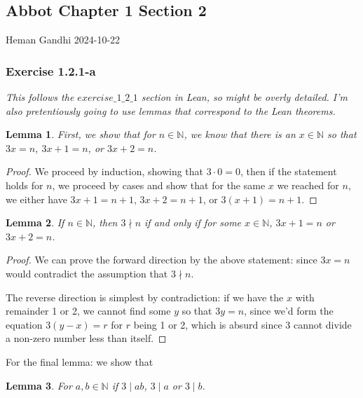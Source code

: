 \documentclass{article}
\newcommand{\N}{\mathbb{N}}
\newtheorem*{lemma}{Lemma}
\begin{document}
\begin{center}
\subsection*{Abbot Chapter 1 Section 2}
\end{center}

Heman Gandhi
\hfill
2024-10-22\\

\subsubsection*{Exercise 1.2.1-a}

\textit{This follows the $exercise\_1\_2\_1$ section in Lean, so might be overly detailed. I'm also pretentiously going to use lemmas that correspond to the Lean theorems.}

\begin{lemma}
First, we show that for $n \in \N$, we know that there is an $x \in \N$ so that $3x = n$,
$3x + 1 = n$, or $3x + 2 = n$.
\end{lemma}

\begin{proof}
We proceed by induction, showing that $3 \cdot 0 = 0$, then
if the statement holds for $n$, we proceed by cases and show that for the same $x$ we reached for
$n$, we either have $3x + 1 = n + 1$, $3x + 2 = n + 1$, or $3(x + 1) = n + 1$.
\end{proof}

\begin{lemma}
If $n \in \N$, then $3 \nmid n$ if and only if for some $x \in \N$, $3x + 1 = n$
or $3x + 2 = n$.
\end{lemma}

\begin{proof}
We can prove the forward direction by the above statement: since $3x = n$ would contradict
the assumption that $3 \nmid n$.

The reverse direction is simplest by contradiction: if we have the $x$ with
remainder 1 or 2, we cannot find some $y$ so that $3y = n$, since we'd form the equation $3(y - x) = r$ for $r$
being 1 or 2, which is absurd since 3 cannot divide a non-zero number less than itself.
\end{proof}

For the final lemma: we show that

\begin{lemma}
For $a, b \in \N$ if $3 \mid ab$, $3 \mid a$ or $3 \mid b$.
\end{lemma}
\end{document}
